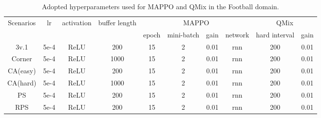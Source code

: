 \begin{table}[]
\centering
\begin{tabular}{cccccccc|cc}
\toprule
\multirow{2}{*}{Scenarios} & \multirow{2}{*}{lr} & \multirow{2}{*}{activation} & \multirow{2}{*}{buffer length} & \multicolumn{4}{c}{MAPPO}                             & \multicolumn{2}{c}{QMix} \\ \cmidrule{5-10}
                      &                     &             &                & epoch & mini-batch & gain & network  & hard interval   & gain   \\
\midrule
3v.1             & 5e-4                & ReLU        & 200                & 15    & 2          & 0.01 & rnn                   & 200             & 0.01   \\
Corner                    & 5e-4                & ReLU    & 1000                    & 15    & 2          & 0.01 & rnn                   & 200             & 0.01   \\
CA(easy)            & 5e-4                & ReLU     & 200                    & 15    & 2          & 0.01 & rnn                 & 200             & 0.01   \\
CA(hard)            & 5e-4                & ReLU      & 1000                  & 15    & 2          & 0.01 & rnn                  & 200             & 0.01   \\
PS             & 5e-4                & ReLU        & 200                 & 15    & 2          & 0.01 & rnn                  & 200             & 0.01   \\
RPS             & 5e-4                & ReLU       & 200                  & 15    & 2          & 0.01 & rnn                 & 200             & 0.01   \\
\bottomrule
\end{tabular}
\caption{Adopted hyperparameters used for MAPPO and QMix in the Football domain.}
\label{tab:diff-Football}
\end{table}



